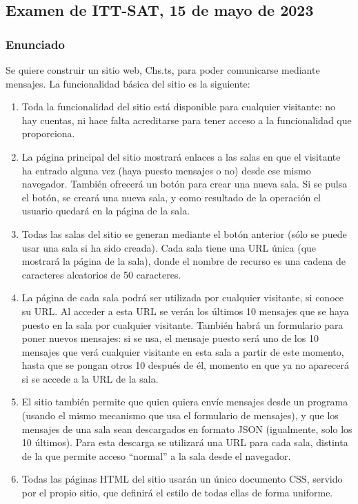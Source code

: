\subsection{Examen de ITT-SAT, 15 de mayo de 2023}

\subsubsection{Enunciado}

Se quiere construir un sitio web, Chs.ts, para poder comunicarse mediante mensajes. La funcionalidad básica del sitio es la siguiente:

\begin{enumerate}
\item Toda la funcionalidad del sitio está disponible para cualquier visitante: no hay cuentas, ni hace falta acreditarse para tener acceso a la funcionalidad que proporciona.

\item La página principal del sitio mostrará enlaces a las salas en que el visitante ha entrado alguna vez (haya puesto mensajes o no) desde ese mismo navegador. También ofrecerá un botón para crear una nueva sala. Si se pulsa el botón, se creará una nueva sala, y como resultado de la operación el usuario quedará en la página de la sala.

\item Todas las salas del sitio se generan mediante el botón anterior (sólo se puede usar una sala si ha sido creada). Cada sala tiene una URL única (que mostrará la página de la sala), donde el nombre de recurso es una cadena de caracteres aleatorios de 50 caracteres.

\item La página de cada sala podrá ser utilizada por cualquier visitante, si conoce su URL. Al acceder a esta URL se verán los últimos 10 mensajes que se haya puesto en la sala por cualquier visitante. También habrá un formulario para poner nuevos mensajes: si se usa, el mensaje puesto será uno de los 10 mensajes que verá cualquier visitante en esta sala a partir de este momento, hasta que se pongan otros 10 después de él, momento en que ya no aparecerá si se accede a la URL de la sala.

\item El sitio también permite que quien quiera envíe mensajes desde un programa (usando el mismo mecanismo que usa el formulario de mensajes), y que los mensajes de una sala sean descargados en formato JSON (igualmente, solo los 10 últimos). Para esta descarga se utilizará una URL para cada sala, distinta de la que permite acceso ``normal'' a la sala desde el navegador.

\item Todas las páginas HTML del sitio usarán un único documento CSS, servido por el propio sitio, que definirá el estilo de todas ellas de forma uniforme.
\end{enumerate}

